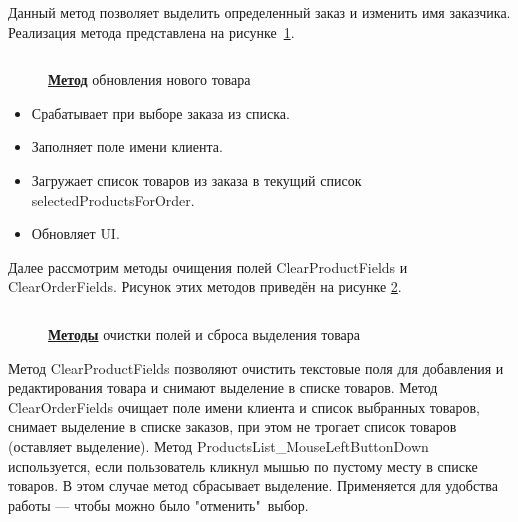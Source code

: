 \documentclass[12pt]{article}
\newcommand{\colorGIT}[1]{\textbf{#1}}
\renewcommand{\texttt}[1]{{\small\ttfamily #1}}
\numberwithin{listing}{section}
\numberwithin{figure}{section}
\begin{document}
Данный метод позволяет выделить определенный заказ и изменить имя заказчика. Реализация метода представлена на рисунке~\ref{fig:MethodUpdate3}.

\begin{figure}[H]
	\centering
	\inputminted[firstline=379, lastline=390]{csharp}{../../3lab/StoreManager/MainWindow.xaml.cs}
	\caption{\colorGIT{\href{https://github.com/WebMasterIT/Csharp_Labs/blob=ec375afd16c0647b337cf3d8a79c8bef904fc1be/3lab/StoreManager/MainWindow.xaml.cs\#L379-L390}{Метод}} обновления нового товара }
	\label{fig:MethodUpdate3}
\end{figure}

\begin{itemize}
	\item Срабатывает при выборе заказа из списка.
	\item Заполняет поле имени клиента.
	\item Загружает список товаров из заказа в текущий список \texttt{selectedProductsForOrder}.
	\item Обновляет \texttt{UI}.
\end{itemize}

{}


Далее рассмотрим методы очищения полей \texttt{ClearProductFields} и \texttt{ClearOrderFields}. Рисунок этих методов приведён на рисунке \ref{fig:MethodClear}.

\begin{figure}[H]
	\centering
	\inputminted[firstline=392, lastline=432]{csharp}{../../3lab/StoreManager/MainWindow.xaml.cs}
	\caption{\colorGIT{\href{https://github.com/WebMasterIT/Csharp_Labs/blob=ec375afd16c0647b337cf3d8a79c8bef904fc1be/3lab/StoreManager/MainWindow.xaml.cs\#L379-L432}{Методы}} очистки полей и сброса выделения товара}
	\label{fig:MethodClear}
\end{figure}

Метод \texttt{ClearProductFields} позволяют очистить текстовые поля для добавления и редактирования товара и снимают выделение в списке товаров. Метод \texttt{ClearOrderFields} очищает поле имени клиента и список выбранных товаров, снимает выделение в списке заказов, при этом не трогает список товаров (оставляет выделение). Метод \texttt{ProductsList\_MouseLeftButtonDown} используется, если пользователь кликнул мышью по пустому месту в списке товаров. В этом случае метод сбрасывает выделение. Применяется для удобства работы — чтобы можно было "отменить"\ выбор.
\end{document}

